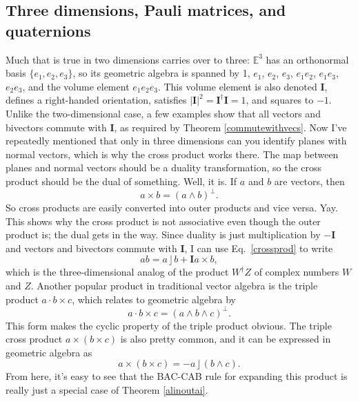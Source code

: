 \documentclass{utarticle}
\newcommand{\bl}[1]{\ensuremath{\bm{#1}}}
\newcommand{\I}{\bl{I}}
\DeclareMathOperator{\inp}{\cdot}
\DeclareMathOperator{\lin}{\rfloor}
\DeclareMathOperator{\out}{\wedge}
\newcommand{\rev}[1]{\ensuremath{#1^\dagger}}
\newcommand{\dual}[1]{\ensuremath{#1^\perp}}
\begin{document}
\subsection{Three dimensions, Pauli matrices, and quaternions}
\label{3d}

Much that is true in two dimensions carries over to three:
$\mathbb{E}^3$ has an orthonormal basis $\{e_1, e_2, e_3\}$, so its
geometric algebra is spanned by 1, $e_1$, $e_2$, $e_3$, $e_1 e_2$,
$e_1 e_3$, $e_2 e_3$, and the volume element $e_1 e_2 e_3$.  This
volume element is also denoted \I, defines a right-handed
orientation, satisfies $|\I|^2 = \rev{\I} \I = 1$, and squares to $-1$.  
Unlike the two-dimensional case, a few examples show that all vectors 
and bivectors commute with \I, as required by Theorem \ref{commutewithvecs}.  
Now I've repeatedly
mentioned that only in three dimensions can you identify planes with normal
vectors, which is why the cross product works there.  The map between
planes and normal vectors should be a duality transformation, so the
cross product should be the dual of something.  Well, it is.  If $a$ and $b$
are vectors, then
\begin{equation} 
a \times b = \dual{(a \out b)}.
\label{crossprod} 
\end{equation}
So cross products are easily converted into outer products and vice versa.  
Yay.  This shows why the cross product is not associative even though the outer 
product is; the dual gets in the way.    Since duality is just multiplication by $-\I$ 
and vectors and bivectors commute with \I, I can use Eq.~\eqref{crossprod} to write
\begin{equation} a b = a \lin b + \I a \times b, \end{equation}
which is the three-dimensional analog of the product $\rev{W}Z$ of complex
numbers $W$ and $Z$.  Another popular product in traditional
vector algebra is the triple product $a \inp b \times c$, which relates to 
geometric algebra by
\begin{equation} a \inp b \times c = \dual{(a \out b \out c)}. \end{equation}
This form makes the cyclic property of the triple product obvious.  The triple cross
product $a \times (b \times c)$ is also pretty common, and it can be expressed in
geometric algebra as
\begin{equation} a \times (b \times c) = -a \lin (b \out c). \end{equation}
From here, it's easy to see that the BAC-CAB rule for expanding this product is 
really just a special case of Theorem \ref{alinoutai}.
\end{document}

